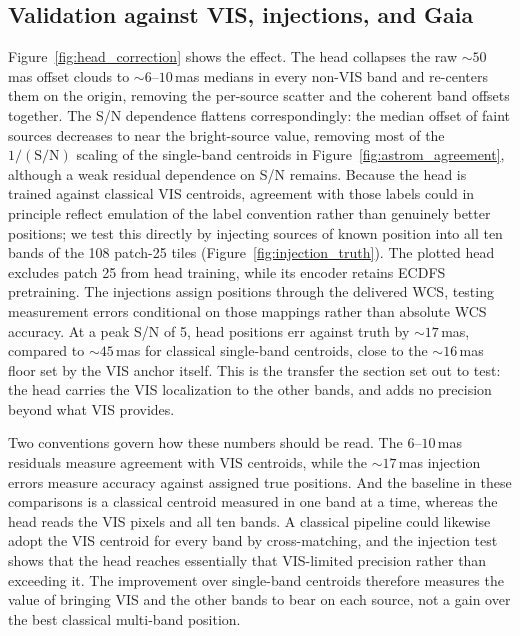 \documentclass[twocolumn,linenumbers]{aastex701}
\begin{document}
\subsection{Validation against VIS, injections, and Gaia}

Figure~\ref{fig:head_correction} shows the effect. The head collapses the raw ${\sim}50$\,mas offset clouds to ${\sim}6$--$10$\,mas medians in every non-VIS band and re-centers them on the origin, removing the per-source scatter and the coherent band offsets together. The S/N dependence flattens correspondingly: the median offset of faint sources decreases to near the bright-source value, removing most of the $1/(\mathrm{S/N})$ scaling of the single-band centroids in Figure~\ref{fig:astrom_agreement}, although a weak residual dependence on S/N remains. Because the head is trained against classical VIS centroids, agreement with those labels could in principle reflect emulation of the label convention rather than genuinely better positions; we test this directly by injecting sources of known position into all ten bands of the 108 patch-25 tiles (Figure~\ref{fig:injection_truth}). The plotted head excludes patch 25 from head training, while its encoder retains ECDFS pretraining. The injections assign positions through the delivered WCS, testing measurement errors conditional on those mappings rather than absolute WCS accuracy. At a peak S/N of 5, head positions err against truth by ${\sim}17$\,mas, compared to ${\sim}45$\,mas for classical single-band centroids, close to the ${\sim}16$\,mas floor set by the VIS anchor itself. This is the transfer the section set out to test: the head carries the VIS localization to the other bands, and adds no precision beyond what VIS provides.

Two conventions govern how these numbers should be read. The $6$--$10$\,mas residuals measure agreement with VIS centroids, while the ${\sim}17$\,mas injection errors measure accuracy against assigned true positions. And the baseline in these comparisons is a classical centroid measured in one band at a time, whereas the head reads the VIS pixels and all ten bands. A classical pipeline could likewise adopt the VIS centroid for every band by cross-matching, and the injection test shows that the head reaches essentially that VIS-limited precision rather than exceeding it. The improvement over single-band centroids therefore measures the value of bringing VIS and the other bands to bear on each source, not a gain over the best classical multi-band position.
\end{document}
